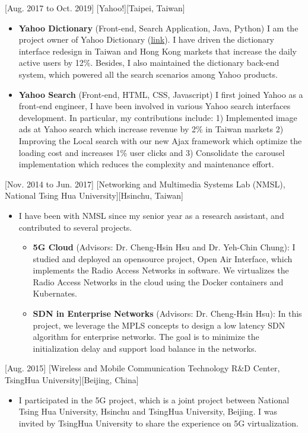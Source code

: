 \documentclass{article}
\begin{document}
[Aug. 2017 to Oct. 2019]
[Yahoo!][Taipei, Taiwan]
\begin{itemize}
\item \textbf{Yahoo Dictionary} (Front-end, Search Application, Java, Python) I am the project owner of Yahoo Dictionary (\href{https://tw.dictionary.search.yahoo.com/}{link}). I have driven the dictionary interface redesign in Taiwan and Hong Kong markets that increase the daily active users by 12\%. Besides, I also maintained the dictionary back-end system, which powered all the search scenarios among Yahoo products.
\item \textbf{Yahoo Search} (Front-end, HTML, CSS, Javascript) I first joined Yahoo as a front-end engineer, I have been involved in various Yahoo search interfaces development. In particular, my contributions include: 1) Implemented image ads at Yahoo search which increase revenue by 2\% in Taiwan markets 2) Improving the Local search with our new Ajax framework which optimize the loading cost and increases 1\% user clicks and 3) Consolidate the carousel implementation which reduces the complexity and maintenance effort.
\end{itemize}

[Nov. 2014 to Jun. 2017]
[Networking and Multimedia Systems Lab (NMSL), National Tsing Hua University][Hsinchu, Taiwan]
\begin{itemize}
\item I have been with NMSL since my senior year as a research assistant, and contributed to several projects. \begin{itemize}
\item \textbf{5G Cloud} (Advisors: Dr. Cheng-Hsin Hsu and Dr. Yeh-Chin Chung):  I studied and deployed an opensource project, Open Air Interface, which implements the Radio Access Networks in software. We virtualizes the Radio Access Networks in the cloud using the Docker containers and Kubernates.
\item \textbf{SDN in Enterprise Networks} (Advisors:  Dr. Cheng-Hsin Hsu): In this project, we leverage the MPLS concepts to design a low latency SDN algorithm for enterprise networks. The goal is to minimize the initialization delay and support load balance in the networks.
\end{itemize}
\end{itemize}

[Aug. 2015]
[Wireless and Mobile Communication Technology R\&D Center, TsingHua University][Beijing, China]
\begin{itemize}
\item I participated in the 5G project, which is a joint project between National Tsing Hua University, Hsinchu and TsingHua University, Beijing. I was invited by TsingHua
University to share the experience on 5G virtualization.
\end{itemize}
\end{document}
